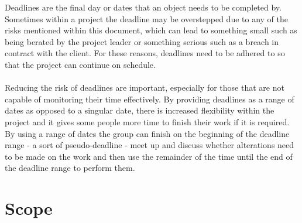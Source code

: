Deadlines are the final day or dates that an object needs to be completed by.
Sometimes within a project the deadline may be overstepped due to any of the
risks mentioned within this document, which can lead to something small such as
being berated by the project leader or something serious such as a breach in
contract with the client.  For these reasons, deadlines need to be adhered to
so that the project can continue on schedule.

\paragraph{}

Reducing the risk of deadlines are important, especially for those that are not
capable of monitoring their time effectively.  By providing deadlines as a range
of dates as opposed to a singular date, there is increased flexibility within
the project and it gives some people more time to finish their work if it is
required.  By using a range of dates the group can finish on the beginning of
the deadline range - a sort of pseudo-deadline - meet up and discuss whether
alterations need to be made on the work and then use the remainder of the time
until the end of the deadline range to perform them.

\section{Scope}
\paragraph{}
